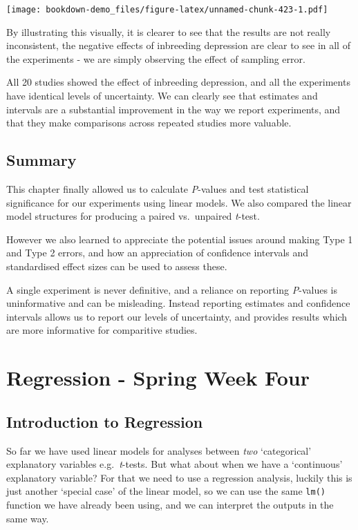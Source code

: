 \documentclass[
]{book}
\begin{document}
\texttt{[image: bookdown-demo\_files/figure-latex/unnamed-chunk-423-1.pdf]}

By illustrating this visually, it is clearer to see that the results are not really inconsistent, the negative effects of inbreeding depression are clear to see in all of the experiments - we are simply observing the effect of sampling error.

All 20 studies showed the effect of inbreeding depression, and all the experiments have identical levels of uncertainty. We can clearly see that estimates and intervals are a substantial improvement in the way we report experiments, and that they make comparisons across repeated studies more valuable.

\hypertarget{summary-3}{%
\section{Summary}\label{summary-3}}

This chapter finally allowed us to calculate \emph{P}-values and test statistical significance for our experiments using linear models. We also compared the linear model structures for producing a paired vs.~unpaired \emph{t}-test.

However we also learned to appreciate the potential issues around making Type 1 and Type 2 errors, and how an appreciation of confidence intervals and standardised effect sizes can be used to assess these.

A single experiment is never definitive, and a reliance on reporting \emph{P}-values is uninformative and can be misleading. Instead reporting estimates and confidence intervals allows us to report our levels of uncertainty, and provides results which are more informative for comparitive studies.

\hypertarget{regression---spring-week-four}{%
\chapter{Regression - Spring Week Four}\label{regression---spring-week-four}}

\hypertarget{introduction-to-regression}{%
\section{Introduction to Regression}\label{introduction-to-regression}}

So far we have used linear models for analyses between \emph{two} `categorical' explanatory variables e.g.~\emph{t}-tests. But what about when we have a `continuous' explanatory variable? For that we need to use a regression analysis, luckily this is just another `special case' of the linear model, so we can use the same \texttt{lm()} function we have already been using, and we can interpret the outputs in the same way.
\end{document}

